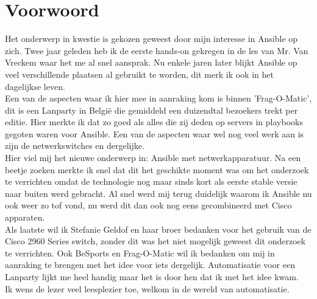 
\chapter*{Voorwoord}
\label{ch:voorwoord}


Het onderwerp in kwestie is gekozen geweest door mijn interesse in Ansible op zich. Twee jaar geleden heb ik de eerste hands-on gekregen in de les van Mr. Van Vreckem waar het me al snel aansprak. Nu enkele jaren later blijkt Ansible op veel verschillende plaatsen al gebruikt te worden, dit merk ik ook in het dagelijkse leven. 
\\

Een van de aspecten waar ik hier mee in aanraking kom is binnen 'Frag-O-Matic', dit is een Lanparty in België die gemiddeld een duizendtal bezoekers trekt per editie. Hier merkte ik dat zo goed als alles die zij deden op servers in playbooks gegoten waren voor Ansible. Een van de aspecten waar wel nog veel werk aan is zijn de netwerkswitches en dergelijke. 
\\
Hier viel mij het nieuwe onderwerp in: Ansible met netwerkapparatuur. Na een beetje zoeken merkte ik snel dat dit het geschikte moment was om het onderzoek te verrichten omdat de technologie nog maar sinds kort als eerste stable versie naar buiten werd gebracht. Al snel werd mij terug duidelijk waarom ik Ansible nu ook weer zo tof vond, nu werd dit dan ook nog eens gecombineerd met Cisco apparaten.
\\

Als laatste wil ik Stefanie Geldof en haar broer bedanken voor het gebruik van de Cisco 2960 Series switch, zonder dit was het niet mogelijk geweest dit onderzoek te verrichten. 
Ook BeSports en Frag-O-Matic wil ik bedanken om mij in aanraking te brengen met het idee voor iets dergelijk. Automatisatie voor een Lanparty lijkt me heel handig maar het is door hen dat ik met het idee kwam.
\\

Ik wens de lezer veel leesplezier toe, welkom in de wereld van automatisatie.